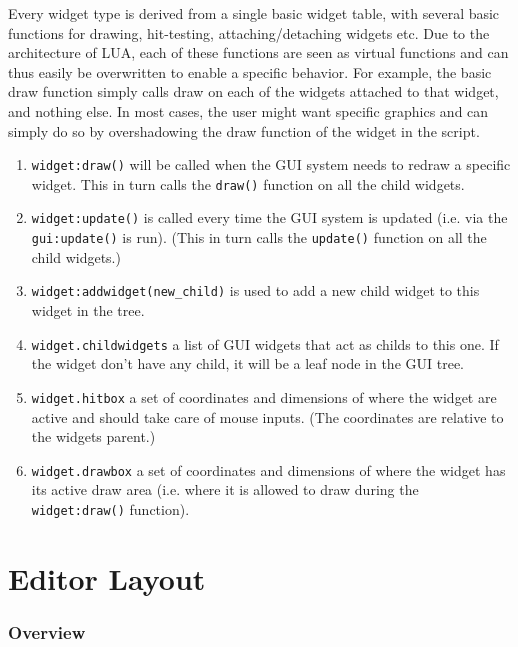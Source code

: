 Every widget type is derived from a single basic widget table, with several basic functions for drawing, hit-testing, attaching/detaching widgets etc. Due to the architecture of LUA, each of these functions are seen as virtual functions and can thus easily be overwritten to enable a specific behavior. For example, the basic draw function simply calls draw on each of the widgets attached to that widget, and nothing else. In most cases, the user might want specific graphics and can simply do so by overshadowing the draw function of the widget in the script. 

\begin{enumerate}
  \item \texttt{widget:draw()} will be called when the GUI system needs to redraw a specific widget. This in turn calls the \texttt{draw()} function on all the child widgets.
  \item \texttt{widget:update()} is called every time the GUI system is updated (i.e. via the \texttt{gui:update()} is run). (This in turn calls the \texttt{update()} function on all the child widgets.)
  \item \texttt{widget:addwidget(new\_child)} is used to add a new child widget to this widget in the tree.
  \item \texttt{widget.childwidgets} a list of GUI widgets that act as childs to this one. If the widget don't have any child, it will be a leaf node in the GUI tree.
  \item \texttt{widget.hitbox} a set of coordinates and dimensions of where the widget are active and should take care of mouse inputs. (The coordinates are relative to the widgets parent.)
  \item \texttt{widget.drawbox} a set of coordinates and dimensions of where the widget has its active draw area (i.e. where it is allowed to draw during the \texttt{widget:draw()} function).
\end{enumerate}

\section{Editor Layout}

\subsubsection{Overview}


